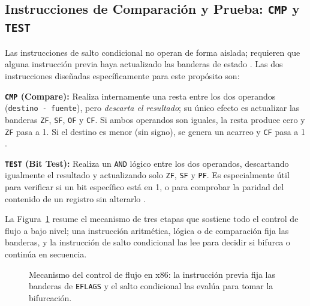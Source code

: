 \documentclass[a4paper,12pt]{article}
\begin{document}
\subsection{Instrucciones de Comparación y Prueba: \texttt{CMP} y \texttt{TEST}}
Las instrucciones de salto condicional no operan de forma aislada; requieren que alguna instrucción previa haya actualizado las banderas de estado \cite{irvine2020assembly}. Las dos instrucciones diseñadas específicamente para este propósito son:

\textbf{\texttt{CMP} (Compare):} Realiza internamente una resta entre los dos operandos (\texttt{destino - fuente}), pero \emph{descarta el resultado}; su único efecto es actualizar las banderas \texttt{ZF}, \texttt{SF}, \texttt{OF} y \texttt{CF}. Si ambos operandos son iguales, la resta produce cero y \texttt{ZF} pasa a 1. Si el destino es menor (sin signo), se genera un acarreo y \texttt{CF} pasa a 1 \cite{irvine2011assembly}.

\textbf{\texttt{TEST} (Bit Test):} Realiza un \texttt{AND} lógico entre los dos operandos, descartando igualmente el resultado y actualizando solo \texttt{ZF}, \texttt{SF} y \texttt{PF}. Es especialmente útil para verificar si un bit específico está en 1, o para comprobar la paridad del contenido de un registro sin alterarlo \cite{elahi2022computer}.

La Figura~\ref{fig:mecanismo_salto} resume el mecanismo de tres etapas que sostiene todo el control de flujo a bajo nivel; una instrucción aritmética, lógica o de comparación fija las banderas, y la instrucción de salto condicional las lee para decidir si bifurca o continúa en secuencia.

\begin{figure}[H]
\centering
{}
\caption{Mecanismo del control de flujo en x86: la instrucción previa fija las banderas de \texttt{EFLAGS} y el salto condicional las evalúa para tomar la bifurcación.}
\label{fig:mecanismo_salto}
\end{figure}
\end{document}
